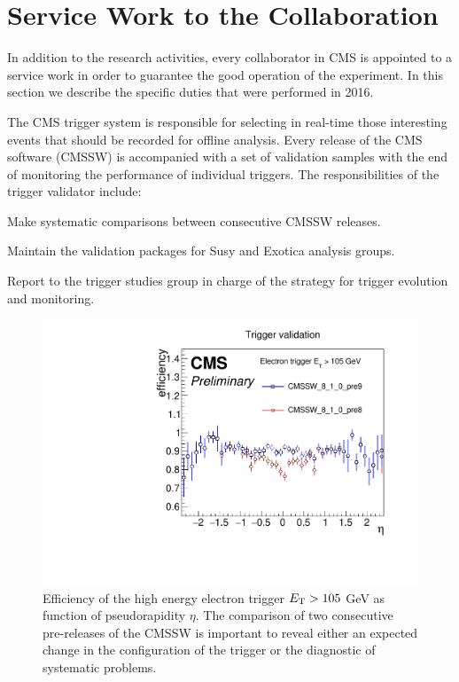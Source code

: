 \section{Service Work to the Collaboration}
In addition to the research activities, every collaborator in CMS is appointed to a service work in order to guarantee the good operation of the experiment. In this section we describe the specific duties that were performed in 2016. 

The CMS trigger system is responsible for selecting in real-time those interesting events that should be recorded for offline analysis. Every release of the CMS software (CMSSW) is accompanied with a set of validation samples with the end of monitoring the performance of individual triggers. The responsibilities of the trigger validator include:

\begin{compact_itemize}
\item Make systematic comparisons between consecutive CMSSW releases.
\item Maintain the validation packages for Susy and Exotica analysis groups.
\item Report to the trigger studies group in charge of the strategy for trigger evolution and monitoring.
\end{compact_itemize}

\begin{figure}[htb]
\begin{center}
\includegraphics[scale=0.55]{figures/fits/triggerValidation.pdf}
\caption{Efficiency of the high energy electron trigger $E_{\rm T}> 105$ GeV as function of pseudorapidity $\eta$. The comparison of two consecutive pre-releases of the CMSSW is important to reveal either an expected change in the configuration of the trigger or the diagnostic of systematic problems.}
\label{monitor}
\end{center}
\end{figure}


